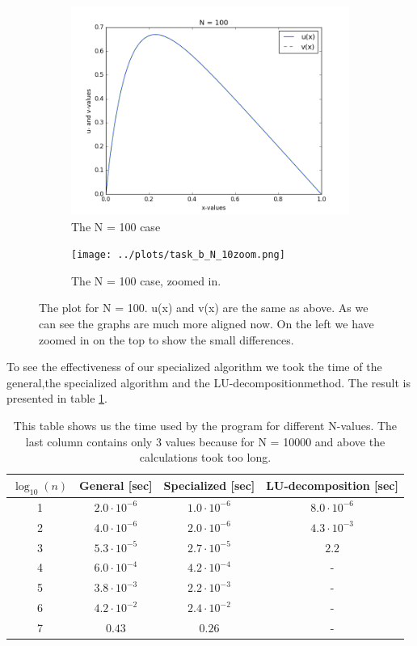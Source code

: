 \documentclass[12pt,a4paper]{article}
\newcommand{\E}[1]{\cdot 10^{#1}}
\begin{document}
\begin{figure}[H]
\centering
\begin{subfigure}{0.3\textwidth}
	\includegraphics[scale=0.35]{../plots/task_b_N_100.png}
	\caption{The N = 100 case}	
	\label{fig:N100}
\end{subfigure}
\qquad \qquad \qquad
\begin{subfigure}{0.3\textwidth}
	\texttt{[image: ../plots/task\_b\_N\_10zoom.png]}
	\caption{The N = 100 case, zoomed in.}
	\label{fig:N100Zoom}
\end{subfigure}
\caption{The plot for N = 100. u(x) and v(x) are the same as above. As we can see the graphs are much more aligned now. On the left we have zoomed in on the top to show the small differences.}
\label{fig:N100S}
\end{figure}
To see the effectiveness of our specialized algorithm we took the time of the general,the specialized algorithm and the LU-decompositionmethod. The result is presented in table \ref{tab:time}.
\begin{table}[H]
\centering
\begin{tabular}{|c|c|c|c|} \hline
$\log_{10}(n)$ & General [sec] & Specialized [sec] & LU-decomposition [sec] \\ \hline
1 &  $2.0\E{-6}$ & $1.0\E{-6}$ & $8.0\E{-6}$ \\ \hline
2 &  $4.0\E{-6}$ & $2.0\E{-6}$ & $4.3\E{-3}$ \\ \hline
3 &  $5.3\E{-5}$ & $2.7\E{-5}$ & $2.2$ \\ \hline
4 &  $6.0\E{-4}$ & $4.2\E{-4}$ & - \\ \hline
5 &  $3.8\E{-3}$ & $2.2\E{-3}$ & - \\ \hline
6 &  $4.2\E{-2}$ & $2.4\E{-2}$ & - \\ \hline
7 &  $0.43$       & $0.26$     & - \\ \hline
\end{tabular}
\caption{This table shows us the time used by the program for different N-values. The last column contains only 3 values because for N = 10000 and above the calculations took too long.}
\label{tab:time}
\end{table}
\end{document}
